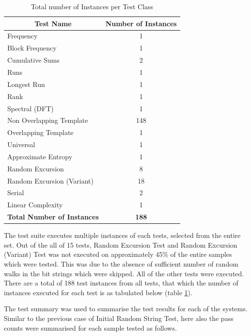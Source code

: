 \begin{table}[h!]
    \centering
    \begin{tabular}{|l|c|}
        \hline
        \multicolumn{1}{|c|}{\textbf{Test Name}} & \textbf{Number of Instances} \\ \hline
        Frequency & 1 \\ \hline
        Block Frequency & 1 \\ \hline
        Cumulative Sums & 2 \\ \hline
        Runs & 1 \\ \hline
        Longest Run & 1 \\ \hline
        Rank & 1 \\ \hline
        Spectral (DFT) & 1 \\ \hline
        Non Overlapping Template & 148 \\ \hline
        Overlapping Template & 1 \\ \hline
        Universal & 1 \\ \hline
        Approximate Entropy & 1 \\ \hline
        Random Excursion & 8 \\ \hline
        Random Excursion (Variant) & 18 \\ \hline
        Serial & 2 \\ \hline
        Linear Complexity & 1 \\ \hline
        \textbf{Total Number of Instances} & \textbf{188} \\ \hline
    \end{tabular}
    \caption{Total number of Instances per Test Class}
    \label{tbl:5_nist_total_instances}
\end{table}

The test suite executes multiple instances of each tests, selected from the entire set. Out of the all of 15 tests, Random Excursion Test and Random Excursion (Variant) Test was not executed on approximately 45\% of the entire samples which were tested. This was due to the absence of sufficient number of random walks in the bit strings which were skipped. All of the other tests were executed. There are a total of 188 test instances from all tests, that which the number of instances executed for each test is as tabulated below (table \ref{tbl:5_nist_total_instances}).

The test summary was used to summarise the test results for each of the systems. Similar to the previous case of Initial Random String Test, here also the pass counts were summarised for each sample tested as follows.

